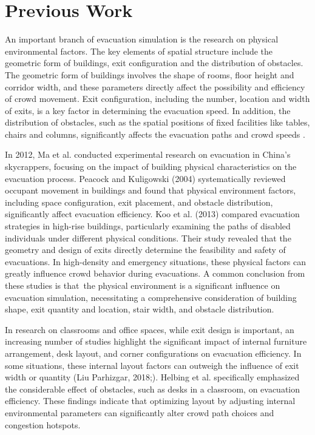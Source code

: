 \section{}


\section{Previous Work}
An important branch of evacuation simulation is the research on physical environmental factors. The key elements of spatial structure include the geometric form of buildings, exit configuration and the distribution of obstacles. The geometric form of buildings involves the shape of rooms, floor height and corridor width, and these parameters directly affect the possibility and efficiency of crowd movement. Exit configuration, including the number, location and width of exits, is a key factor in determining the evacuation speed. In addition, the distribution of obstacles, such as the spatial positions of fixed facilities like tables, chairs and columns, significantly affects the evacuation paths and crowd speeds .

In 2012, Ma et al. conducted experimental research on evacuation in China's skycrappers, focusing on the impact of building physical characteristics on the evacuation process. Peacock and Kuligowski (2004) systematically reviewed occupant movement in buildings and found that physical environment factors, including space configuration, exit placement, and obstacle distribution, significantly affect evacuation efficiency. Koo et al. (2013) compared evacuation strategies in high-rise buildings, particularly examining the paths of disabled individuals under different physical conditions. Their study revealed that the geometry and design of exits directly determine the feasibility and safety of evacuations. In high-density and emergency situations, these physical factors can greatly influence crowd behavior during evacuations. A common conclusion from these studies is that the physical environment is a significant influence on evacuation simulation, necessitating a comprehensive consideration of building shape, exit quantity and location, stair width, and obstacle distribution.

In research on classrooms and office spaces, while exit design is important, an increasing number of studies highlight the significant impact of internal furniture arrangement, desk layout, and corner configurations on evacuation efficiency. In some situations, these internal layout factors can outweigh the influence of exit width or quantity (Liu Parhizgar, 2018;). Helbing et al. specifically emphasized the considerable effect of obstacles, such as desks in a classroom, on evacuation efficiency. These findings indicate that optimizing layout by adjusting internal environmental parameters can significantly alter crowd path choices and congestion hotspots.

